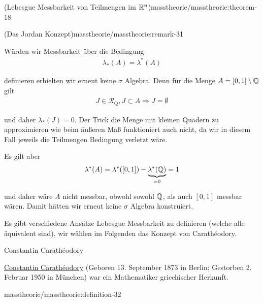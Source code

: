 \begin{theorem}{(Lebesgue Messbarkeit von Teilmengen im \protect\(\mathbb{R}^n\protect\))}{masstheorie/masstheorie:theorem-18}
\begin{remark}{(Das Jordan Konzept)}{masstheorie/masstheorie:remark-31}
\par
Würden wir Messbarkeit über die Bedingung
\begin{align*}
\lambda_\ast(A)=\lambda^\ast(A)
\end{align*}
\par
definieren erhielten wir erneut keine \(\sigma\) Algebra. Denn für die Menge \(A=[0,1]\setminus\mathbb{Q}\) gilt
\begin{align*}
J\in\mathcal{R}_{\text{Q}}, J\subset A\Rightarrow J=\emptyset
\end{align*}
\par
und daher \(\lambda_\ast(J) = 0\). Der Trick die Menge mit kleinen Quadern zu approximieren wie beim äußeren Maß funktioniert auch nicht, da wir in diesem Fall jeweils die Teilmengen Bedingung verletzt wäre.

\par
Es gilt aber
\begin{align*}
\lambda^\ast(A) = \lambda^\ast([0,1]) - \underbrace{\lambda^\ast(\mathbb{Q})}_{=0} = 1
\end{align*}
\par
und daher wäre \(A\) nicht messbar, obwohl sowohl \(\mathbb{Q}\), als auch \([0,1]\) messbar wären. Damit hätten wir erneut keine \(\sigma\) Algebra konstruiert.
\end{remark}

\par
Es gibt verschiedene Ansätze Lebesgue Messbarkeit zu definieren (welche alle äquivalent sind), wir wählen im Folgenden das Konzept von
Carathéodory.

\begin{emphBox}{Constantin Carathéodory}{}

\par
\href{https://de.wikipedia.org/wiki/Constantin\_Carath\%C3\%A9odory}{Constantin Carathéodory} (Geboren 13. September 1873 in Berlin; Gestorben 2. Februar 1950 in München) war ein Mathematiker griechischer Herkunft.
\end{emphBox}
\begin{definition}{}{masstheorie/masstheorie:definition-32}




\end{definition}
\end{theorem}
